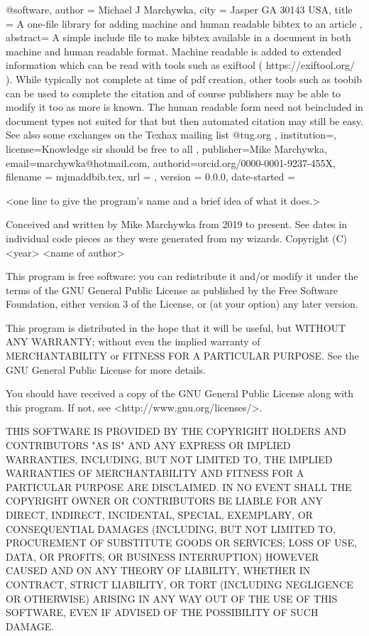 
\iffalse
@software{,
  author = {Michael J Marchywka},
  city = {Jasper GA 30143 USA},
  title = { A one-file library for adding machine and human readable bibtex to an article },
abstract={ A simple include file to make bibtex available 
in a document in both machine and human readable format. 
Machine readable is added to extended information 
which can be read with tools such as exiftool ( https://exiftool.org/ ).
While typically not complete at time of pdf creation,
other tools such as toobib can be used to complete the citation
and of course publishers may be able to modify it too as 
more is known. The human readable form need not beincluded
in document types not suited for that but then automated citation
may still be easy.  
See also some exchanges on the Texhax mailing list @tug.org },
institution={},
license={Knowledge sir should be free to all },
publisher={Mike Marchywka},
email={marchywka@hotmail.com},
authorid={orcid.org/0000-0001-9237-455X},
  filename = {mjmaddbib.tex},
  url = {},
  version = {0.0.0},
  date-started = {}
}

<one line to give the program's name and a brief idea of what it does.>


Conceived and written by Mike Marchywka from 2019 to present.
See dates in individual code pieces as they were 
generated from my wizards. 
Copyright (C) <year> <name of author>


This program is free software: you can redistribute it and/or modify it under
the terms of the GNU General Public License as published by the Free Software
Foundation, either version 3 of the License, or (at your option) any later
version.

This program is distributed in the hope that it will be useful, but WITHOUT ANY
WARRANTY; without even the implied warranty of  MERCHANTABILITY or FITNESS FOR
A PARTICULAR PURPOSE. See the GNU General Public License for more details.

You should have received a copy of the GNU General Public License along with
this program.  If not, see <http://www.gnu.org/licenses/>.

   THIS SOFTWARE IS PROVIDED BY THE COPYRIGHT HOLDERS AND CONTRIBUTORS
   "AS IS" AND ANY EXPRESS OR IMPLIED WARRANTIES, INCLUDING, BUT NOT
   LIMITED TO, THE IMPLIED WARRANTIES OF MERCHANTABILITY AND FITNESS FOR
   A PARTICULAR PURPOSE ARE DISCLAIMED.  IN NO EVENT SHALL THE COPYRIGHT OWNER OR
   CONTRIBUTORS BE LIABLE FOR ANY DIRECT, INDIRECT, INCIDENTAL, SPECIAL,
   EXEMPLARY, OR CONSEQUENTIAL DAMAGES (INCLUDING, BUT NOT LIMITED TO,
   PROCUREMENT OF SUBSTITUTE GOODS OR SERVICES; LOSS OF USE, DATA, OR
   PROFITS; OR BUSINESS INTERRUPTION) HOWEVER CAUSED AND ON ANY THEORY OF
   LIABILITY, WHETHER IN CONTRACT, STRICT LIABILITY, OR TORT (INCLUDING
   NEGLIGENCE OR OTHERWISE) ARISING IN ANY WAY OUT OF THE USE OF THIS
   SOFTWARE, EVEN IF ADVISED OF THE POSSIBILITY OF SUCH DAMAGE.


